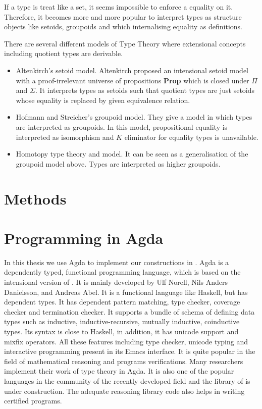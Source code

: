 If a type is treat like a set, it seems impossible to enforce a equality on it. Therefore, it becomes more and more popular to interpret types as structure objects like setoids, groupoids and \wog which internalising equality as definitions. 

There are several different models of Type Theory where extensional concepts including quotient types are derivable.

\begin{itemize}

\item Altenkirch's setoid model. Altenkirch \cite{alti:lics99} proposed an intensional setoid model
with a proof-irrelevant universe of propositions \textbf{Prop} which
is closed under $\Pi$ and $\Sigma$. It interprets types as setoids
such that quotient types are just setoids whose equality is replaced
by given equivalence relation.

\item Hofmann and Streicher's groupoid model. They give a model in which
types are interpreted as groupoids. In this model, propositional
equality is interpreted as isomorphism and $K$ eliminator for equality
types is unavailable. 

\item Homotopy type theory and \wog model. It can be seen as a
generalisation of the groupoid model above. Types are interpreted as
higher groupoids.

\end{itemize}

\section{Methods}




\section{Programming in Agda}

In this thesis we use Agda to implement our constructions in \itt. 
Agda is a dependently typed, functional programming language, which is
based on the intensional version of \mltt. It is mainly developed by
Ulf Norell, Nils Anders Danielsson, and Andreas Abel.
It is a functional language like Haskell, but has dependent types. It has dependent pattern
matching, type checker, coverage checker and termination checker. It
supports a bundle of schema of defining data types such as inductive, inductive-recursive, mutually inductive,
coinductive types. Its syntax is close to Haskell, in addition, it has
unicode support and mixfix operators. All these features including
type checker, unicode typing and interactive programming present in
its Emacs interface. It is quite popular in the field of mathematical reasoning and programs
verifications. Many researchers implement their work of type theory in
Agda. It is also one of the popular languages in the community of the recently
developed field \hott and the library of \hott is under construction.
The adequate reasoning library code also helps in writing certified programs.

